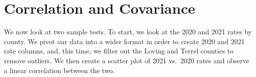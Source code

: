 \documentclass[
  letterpaper,
]{krantz}
\makeatletter
\newenvironment{Shaded}{\begin{snugshade}}{\end{snugshade}}
\newcommand{\AttributeTok}[1]{\textcolor[rgb]{0.40,0.45,0.13}{#1}}
\newcommand{\CommentTok}[1]{\textcolor[rgb]{0.37,0.37,0.37}{#1}}
\newcommand{\FloatTok}[1]{\textcolor[rgb]{0.68,0.00,0.00}{#1}}
\newcommand{\FunctionTok}[1]{\textcolor[rgb]{0.28,0.35,0.67}{#1}}
\newcommand{\NormalTok}[1]{\textcolor[rgb]{0.00,0.23,0.31}{#1}}
\newcommand{\OtherTok}[1]{\textcolor[rgb]{0.00,0.23,0.31}{#1}}
\newcommand{\SpecialCharTok}[1]{\textcolor[rgb]{0.37,0.37,0.37}{#1}}
\newcommand{\StringTok}[1]{\textcolor[rgb]{0.13,0.47,0.30}{#1}}
\newenvironment{kframe}{%
\medskip{}
\setlength{\fboxsep}{.8em}
 \def\at@end@of@kframe{}%
 \ifinner\ifhmode%
  \def\at@end@of@kframe{\end{minipage}}%
  \begin{minipage}{\columnwidth}%
 \fi\fi%
 \def\FrameCommand##1{\hskip\@totalleftmargin \hskip-\fboxsep
 \colorbox{shadecolor}{##1}\hskip-\fboxsep
     \hskip-\linewidth \hskip-\@totalleftmargin \hskip\columnwidth}%
 \MakeFramed {\advance\hsize-\width
   \@totalleftmargin\z@ \linewidth\hsize
   \@setminipage}}%
 {\par\unskip\endMakeFramed%
 \at@end@of@kframe}
\renewenvironment{Shaded}{\begin{kframe}}{\end{kframe}}
\makeatother
\begin{document}
\begin{Shaded}
\end{Shaded}

\section{Correlation and Covariance}\label{correlation-and-covariance}

We now look at two sample tests. To start, we look at the 2020 and 2021
rates by county. We pivot our data into a wider format in order to
create 2020 and 2021 rate columns, and, this time, we filter out the
Loving and Terrel counties to remove outliers. We then create a scatter
plot of 2021 vs.~2020 rates and observe a linear correlation between the
two.
\end{document}
